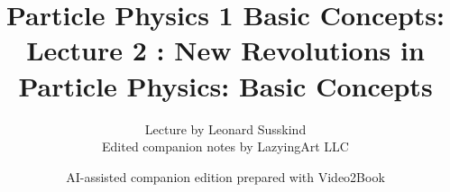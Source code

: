 \documentclass[11pt,oneside]{book}
\begin{document}
\frontmatter
\title{Particle Physics 1 Basic Concepts: Lecture 2 : New Revolutions in Particle Physics: Basic Concepts}
\author{Lecture by Leonard Susskind\\Edited companion notes by LazyingArt LLC}
\date{AI-assisted companion edition prepared with Video2Book}
\maketitle
\clearpage
\mainmatter

\end{document}
